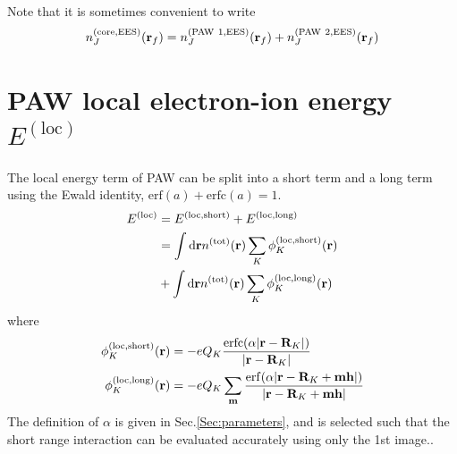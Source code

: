 \documentclass[paper=a4, fontsize=11pt]{article} %
\numberwithin{equation}{section} %
\numberwithin{figure}{section} %
\numberwithin{table}{section} %
\newcommand{\bh}{{\bf{h}}}
\newcommand{\bm}{{\bf{m}}}
\newcommand{\br}{{\bf{r}}}
\newcommand{\bR}{{\bf{R}}}
\newcommand{\rEES}{{\mathrm{EES}}}
\newcommand{\rcore}{{\mathrm{core}}}
\newcommand{\rshort}{{\mathrm{short}}}
\newcommand{\rlong}{{\mathrm{long}}}
\newcommand{\rerf}{{\mathrm{erf}}}
\newcommand{\rerfc}{{\mathrm{erfc}}}
\newcommand{\rP}{{\mathrm{PAW}}}
\newcommand{\rd}{{\mathrm{d}}}
\newcommand{\rlo}{{\mathrm{loc}}}
\newcommand{\rtot}{{\mathrm{tot}}}
\newcommand{\al}{{\alpha}}
\begin{document}
Note that it is sometimes convenient to write
\begin{equation}
n_J^{(\rcore,\rEES)}(\br_f) = n_J^{(\rP\ 1,\rEES)}(\br_f)+ n_J^{(\rP\ 2,\rEES)}(\br_f)
\end{equation}



\newpage

\section{PAW local electron-ion energy $E^{(\rlo)}$}
The local energy term of PAW can be split into a short term and a long term using the Ewald identity, $\mathrm{erf}(a)+\mathrm{erfc}(a)=1$.
\begin{equation}
\begin{split}
E^{(\rlo)}
&=E^{(\rlo,\rshort)}+E^{(\rlo,\rlong)} \\
&=\int \rd \br n^{(\rtot)}(\br) \sum_K\phi_K^{(\rlo,\rshort)}(\br) \\
& +\int \rd \br n^{(\rtot)}(\br) \sum_K\phi_K^{(\rlo,\rlong)}(\br)
\end{split}
\end{equation}
where
\begin{equation}
\begin{split}
\phi_K^{(\rlo,\rshort)}(\br)&=-eQ_K\frac{\rerfc(\alpha|\br-\bR_K|)}{|\br-\bR_K|} \\
\phi_K^{(\rlo,\rlong)}(\br)&=-eQ_K\sum_\bm \frac{\rerf(\alpha|\br-\bR_K+\bm \bh|)}{|\br-\bR_K+\bm\bh|}
\end{split}
\end{equation}
The definition of $\al$ is given in Sec.\ref{Sec:parameters}, and is selected such that the short range interaction can be evaluated accurately using only the 1st image..
\end{document}
